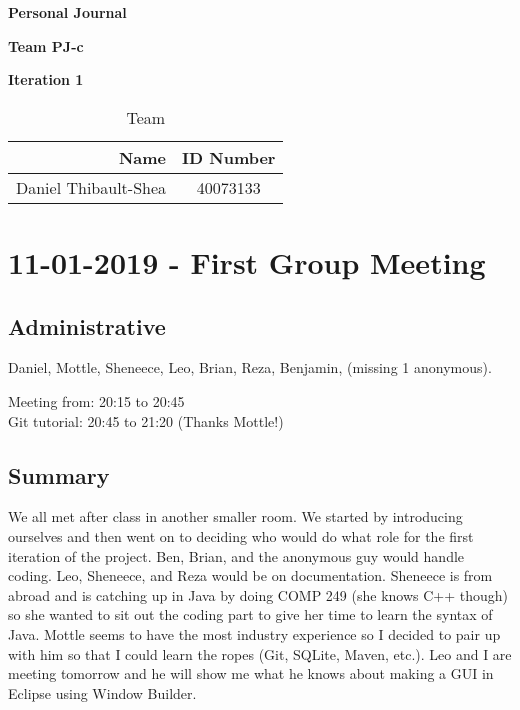 \documentclass[12pt]{article}
\begin{document}
	
	\vspace*{0.5in}
	\centerline{\bf\Large Personal Journal}
	
	\vspace*{0.5in}
	\centerline{\bf\Large Team PJ-c}
	\vspace*{0.25in}
	\centerline{\bf\Large Iteration 1}
	
	
	\vspace*{1.5in}
	\begin{table}[htbp]
		\caption{Team}
		\begin{center}
			\begin{tabular}{|r | c|}
				\hline
				Name & ID Number \\
				\hline\hline
				Daniel Thibault-Shea & 40073133 \\
				\hline
			\end{tabular}
		\end{center}
	\end{table}
	
	\clearpage
	
	\section{11-01-2019 - First Group Meeting}
	
	\subsection{Administrative}
	Daniel, Mottle, Sheneece, Leo, Brian, Reza, Benjamin, (missing 1 anonymous).
	
	Meeting from: 20:15 to 20:45\\
	Git tutorial: 20:45 to 21:20 (Thanks Mottle!)
	
	\subsection{Summary}
	We all met after class in another smaller room. We started by introducing ourselves and then went on to deciding who would do what role for the first iteration of the project. Ben, Brian, and the anonymous guy would handle coding. Leo, Sheneece, and Reza would be on documentation. Sheneece is from abroad and is catching up in Java by doing COMP 249 (she knows C++ though) so she wanted to sit out the coding part to give her time to learn the syntax of Java. Mottle seems to have the most industry experience so I decided to pair up with him so that I could learn the ropes (Git, SQLite, Maven, etc.). Leo and I are meeting tomorrow and he will show me what he knows about making a GUI in Eclipse using Window Builder.
	
\end{document}
